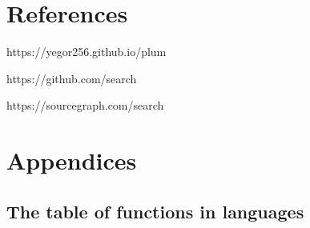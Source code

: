 \documentclass[anonymous,sigplan,review,11pt,nonacm,natbib=false]{acmart}
\begin{document}
    \section{References}

    https://yegor256.github.io/plum

    https://github.com/search

    https://sourcegraph.com/search

    \section{Appendices}

    \subsection{The table of functions in languages}
\end{document}

